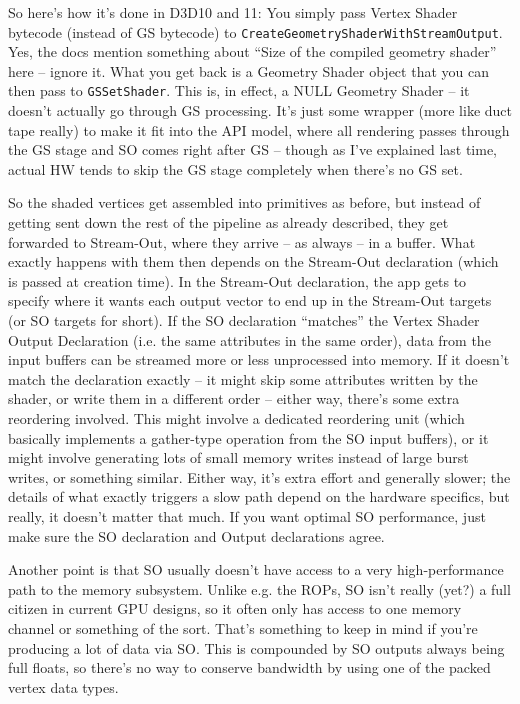 \documentclass[12pt]{article}
\begin{document}
So here’s how it’s done in D3D10 and 11: You simply pass Vertex Shader bytecode (instead of GS bytecode) to \texttt{CreateGeometryShaderWithStreamOutput}. Yes, the docs mention something about “Size of the compiled geometry shader” here – ignore it. What you get back is a Geometry Shader object that you can then pass to \texttt{GSSetShader}. This is, in effect, a NULL Geometry Shader – it doesn’t actually go through GS processing. It’s just some wrapper (more like duct tape really) to make it fit into the API model, where all rendering passes through the GS stage and SO comes right after GS – though as I’ve explained last time, actual HW tends to skip the GS stage completely when there’s no GS set.

So the shaded vertices get assembled into primitives as before, but instead of getting sent down the rest of the pipeline as already described, they get forwarded to Stream-Out, where they arrive – as always – in a buffer. What exactly happens with them then depends on the Stream-Out declaration (which is passed at creation time). In the Stream-Out declaration, the app gets to specify where it wants each output vector to end up in the Stream-Out targets (or SO targets for short). If the SO declaration “matches” the Vertex Shader Output Declaration (i.e. the same attributes in the same order), data from the input buffers can be streamed more or less unprocessed into memory. If it doesn’t match the declaration exactly – it might skip some attributes written by the shader, or write them in a different order – either way, there’s some extra reordering involved. This might involve a dedicated reordering unit (which basically implements a gather-type operation from the SO input buffers), or it might involve generating lots of small memory writes instead of large burst writes, or something similar. Either way, it’s extra effort and generally slower; the details of what exactly triggers a slow path depend on the hardware specifics, but really, it doesn’t matter that much. If you want optimal SO performance, just make sure the SO declaration and Output declarations agree.

Another point is that SO usually doesn’t have access to a very high-performance path to the memory subsystem. Unlike e.g. the ROPs, SO isn’t really (yet?) a full citizen in current GPU designs, so it often only has access to one memory channel or something of the sort. That’s something to keep in mind if you’re producing a lot of data via SO. This is compounded by SO outputs always being full floats, so there’s no way to conserve bandwidth by using one of the packed vertex data types.
\end{document}
